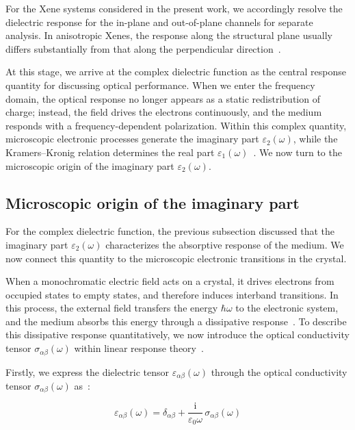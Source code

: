 For the Xene systems considered in the present work,
we accordingly resolve the dielectric response for the in-plane and out-of-plane channels for separate analysis.
In anisotropic Xenes, the response along the structural plane usually differs substantially from that along the perpendicular direction~\cite{marinopoulos2002anisotropy,huang2023optical,slavich2024exploring,cheng2025two}.

At this stage, we arrive at the complex dielectric function as the central response quantity for discussing optical performance.
When we enter the frequency domain, the optical response no longer appears as a static redistribution of charge;
instead, the field drives the electrons continuously, and the medium responds with a frequency-dependent polarization.
Within this complex quantity, microscopic electronic processes generate the imaginary part $\varepsilon_2(\omega)$,
while the Kramers--Kronig relation determines the real part $\varepsilon_1(\omega)$~\cite{de1926theory, toll1956causality, persson2001first}.
We now turn to the microscopic origin of the imaginary part $\varepsilon_2(\omega)$.

\subsection{Microscopic origin of the imaginary part}

For the complex dielectric function,
the previous subsection discussed that the imaginary part $\varepsilon_2(\omega)$ characterizes the absorptive response of the medium.
We now connect this quantity to the microscopic electronic transitions in the crystal.

When a monochromatic electric field acts on a crystal,
it drives electrons from occupied states to empty states,
and therefore induces interband transitions.
In this process, the external field transfers the energy $\hbar\omega$ to the electronic system,
and the medium absorbs this energy through a dissipative response~\cite{toudert2017interband}.
To describe this dissipative response quantitatively,
we now introduce the optical conductivity tensor $\sigma_{\alpha\beta}(\omega)$ within linear response theory~\cite{kubo1957statistical}.

Firstly, we express the dielectric tensor $\varepsilon_{\alpha\beta}(\omega)$ through the optical conductivity tensor $\sigma_{\alpha\beta}(\omega)$ as~\cite{kubo1957statistical,onida2002electronic}:

\begin{equation}
    \varepsilon_{\alpha\beta}(\omega)
    = \delta_{\alpha\beta} + \frac{\mathrm{i}}{\varepsilon_0\omega}\,
    \sigma_{\alpha\beta}(\omega)
\label{dielectric_tensor_from_optical_conductivity}
\end{equation}

